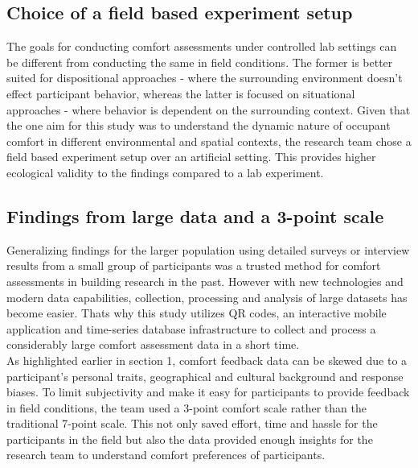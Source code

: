 
\subsection{Choice of a field based experiment setup}

The goals for conducting comfort assessments under controlled lab settings can be different from conducting the same in field conditions. The former is better suited for dispositional approaches - where the surrounding environment doesn't effect participant behavior, whereas the latter is focused on situational approaches - where behavior is dependent on the surrounding context.
Given that the one aim for this study was to understand the dynamic nature of occupant comfort in different environmental and spatial contexts, the research team chose a field based experiment setup over an artificial setting. This provides higher ecological validity \cite{andrade2018internal}to the findings compared to a lab experiment.           


\subsection{Findings from large data and a 3-point scale}

Generalizing findings for the larger population using detailed surveys or interview results from a small group of participants was a trusted method for comfort assessments in building research in the past. However with new technologies and modern data capabilities, collection, processing and analysis of large datasets has become easier. Thats why this study utilizes QR codes, an interactive mobile application and time-series database infrastructure to collect and process a considerably large comfort assessment data in a short time.\\

As highlighted earlier in section 1, comfort feedback data can be skewed due to a participant's personal traits, geographical and cultural background and response biases. To limit subjectivity and make it easy for participants to provide feedback in field conditions, the team used a 3-point comfort scale rather than the traditional 7-point scale. This not only saved effort, time and hassle for the participants in the field but also the data provided enough insights for the research team to understand comfort preferences of participants.\\

